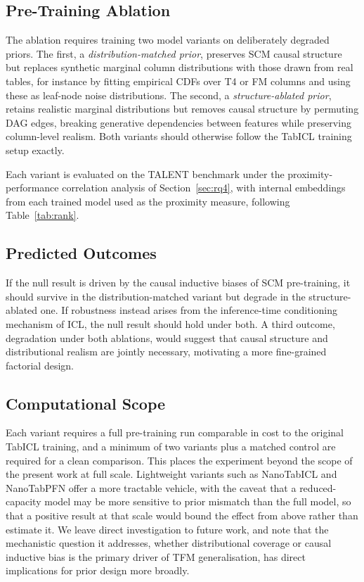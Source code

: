 \documentclass{article}
\begin{document}
\subsection*{Pre-Training Ablation}

The ablation requires training two model variants on deliberately degraded priors.
The first, a \textit{distribution-matched prior}, preserves SCM causal structure but replaces
synthetic marginal column distributions with those drawn from real tables, for instance by
fitting empirical CDFs over T4 or FM columns and using these as leaf-node noise distributions.
The second, a \textit{structure-ablated prior}, retains realistic marginal distributions but
removes causal structure by permuting DAG edges, breaking generative dependencies between
features while preserving column-level realism. Both variants should otherwise follow the
TabICL training setup exactly.

Each variant is evaluated on the TALENT benchmark under the proximity-performance
correlation analysis of Section~\ref{sec:rq4}, with internal embeddings from each trained
model used as the proximity measure, following Table~\ref{tab:rank}.

\subsection*{Predicted Outcomes}

If the null result is driven by the causal inductive biases of SCM pre-training, it should
survive in the distribution-matched variant but degrade in the structure-ablated one.
If robustness instead arises from the inference-time conditioning mechanism of ICL,
the null result should hold under both. A third outcome, degradation under both
ablations, would suggest that causal structure and distributional realism are jointly
necessary, motivating a more fine-grained factorial design.

\subsection*{Computational Scope}

Each variant requires a full pre-training run comparable in cost to the original TabICL
training, and a minimum of two variants plus a matched control are required for a clean
comparison. This places the experiment beyond the scope of the present work at full scale.
Lightweight variants such as NanoTabICL and NanoTabPFN offer a more tractable vehicle, with
the caveat that a reduced-capacity model may be more sensitive to prior mismatch than the full
model, so that a positive result at that scale would bound the effect from above rather than
estimate it. We leave
direct investigation to future work, and note that the mechanistic question it
addresses, whether distributional coverage or causal inductive bias is the primary
driver of TFM generalisation, has direct implications for prior design more broadly.
\end{document}
